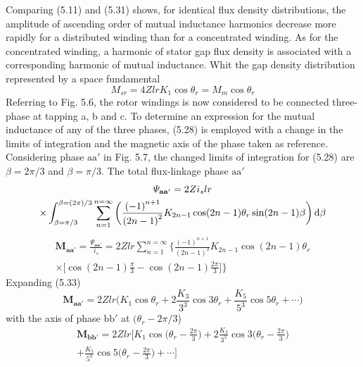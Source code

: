 \documentclass[a4paper,numbers=noenddot,12pt]{scrbook}
\begin{document}
Comparing (5.11) and (5.31) shows, for identical flux density distributions, the amplitude of ascending order of mutual inductance harmonics decrease more rapidly for a distributed winding than for a concentrated winding. As for the concentrated winding, a harmonic of stator gap flux density is associated with a corresponding harmonic of mutual inductance. Whit the gap density distribution represented by a space fundamental
\begin{equation}
    M_{sr} = 4Z l r K_1 \cos \theta_r = M_m \cos \theta_r
\end{equation}
Referring to Fig. 5.6, the rotor windings is now considered to be connected three-phase at tapping a, b and c. To determine an expression for the mutual inductance of any of the three phases, (5.28) is employed with a change in the limits of integration and the magnetic axis of the phase taken as reference. Considering phase $\textrm{aa}'$ in Fig. 5.7, the changed limits of integration for (5.28) are $\beta = 2\pi / 3$ and $\beta = \pi / 3$. The total flux-linkage phase $\textrm{aa}'$
\begin{multline*}
    \mathbf{\varPsi_{aa'}} = 2 Z i_s l r \\
    \times \int_{\beta = \pi / 3}^{\beta = (2 \pi)/3} \displaystyle \sum_{n = 1}^{n = \infty} \bigg( \frac{{(-1)}^{n+1}}{{(2n - 1)}^2}K_{2n-1} \cos(2n - 1) \theta_r \sin(2n - 1) \beta \bigg) \dif \beta \\
\end{multline*}
\begin{multline}
    \mathbf{M_{aa'}} = \frac{\mathbf{\varPsi_{aa'}}}{i_s} = 2 Z l r \displaystyle \sum_{n = 1}^{n = \infty}  \bigg \{\frac{{(-1)}^{n+1}}{{(2n -1)}^2} K_{2n - 1} \cos(2n - 1) \theta_r  \\
    \times \bigg[ \cos(2n - 1) \frac{\pi}{3}  - \cos(2n -1) \frac{2\pi}{3} \bigg] \bigg \}
\end{multline}
Expanding (5.33)
\begin{equation*}
    \mathbf{M_{aa'}} = 2 Z l r \bigg( K_1 \cos \theta_r + 2 \frac{K_3}{3^3} \cos 3 \theta_r + \frac{K_5}{5^3} \cos 5 \theta_r + \cdots \bigg)
\end{equation*}
with the axis of phase $\textrm{bb}'$ at $(\theta_r - 2\pi/3$)
\begin{multline} %
    \boldsymbol{M_\mathbf{bb'}} = 2 Z l r \bigg[ K_1 \cos \bigg(\theta_r - \frac{2 \pi}{3} \bigg) + 2 \frac{K_3}{3^3} \cos 3 \bigg(\theta_r - \frac{2 \pi}{3} \bigg) \\
    + \frac{K_5}{5^3} \cos 5 \bigg( \theta_r - \frac{2 \pi}{3} \bigg ) + \cdots \bigg]
\end{multline}
\end{document}
